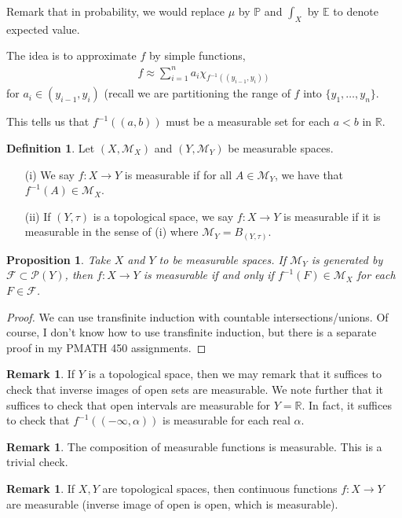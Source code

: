 \documentclass[11pt]{amsart}
\newtheorem{proposition}[theorem]{Proposition}
\theoremstyle{definition}
\newtheorem{definition}[theorem]{Definition}
\newtheorem{remark}[theorem]{Remark}
\numberwithin{equation}{section}
\begin{document}
Remark that in probability, we would replace $\mu$ by $\mathbb P$ and $\int_X$ by $\mathbb E$ to denote expected value.

The idea is to approximate $f$ by simple functions,
\begin{align*}
    f\approx\sum_{i=1}^na_i\chi_{f^{-1}((y_{i-1},y_i))}
\end{align*}
for $a_i\in(y_{i-1},y_i)$ (recall we are partitioning the range of $f$ into $\{y_1,\ldots,y_n\}$.

This tells us that $f^{-1}((a,b))$ must be a measurable set for each $a<b$ in $\mathbb R$.
\begin{definition}
    Let $(X,\mathcal M_X)$ and $(Y,\mathcal M_Y)$ be measurable spaces. 
    \begin{enumerate}
        \item [(i)] We say $f:X\to Y$ is measurable if for all $A\in\mathcal M_Y$, we have that $f^{-1}(A)\in\mathcal M_X$.
        \item [(ii)] If $(Y,\tau)$ is a topological space, we say $f:X\to Y$ is measurable if it is measurable in the sense of (i) where $\mathcal M_Y=B_{(Y,\tau)}$.
    \end{enumerate}
\end{definition}
\begin{proposition}
    Take $X$ and $Y$ to be measurable spaces. If $\mathcal M_Y$ is generated by $\mathcal F\subset \mathcal P(Y)$, then $f:X\to Y$ is measurable if and only if $f^{-1}(F)\in\mathcal M_X$ for each $F\in\mathcal F$.
\end{proposition}
\begin{proof}
    We can use transfinite induction with countable intersections/unions. Of course, I don't know how to use transfinite induction, but there is a separate proof in my PMATH 450 assignments.
\end{proof}
\begin{remark}
    If $Y$ is a topological space, then we may remark that it suffices to check that inverse images of open sets are measurable. We note further that it suffices to check that open intervals are measurable for $Y=\mathbb R$. In fact, it suffices to check that $f^{-1}((-\infty,\alpha))$ is measurable for each real $\alpha$.
\end{remark}
\begin{remark}
    The composition of measurable functions is measurable. This is a trivial check.
\end{remark}
\begin{remark}
    If $X,Y$ are topological spaces, then continuous functions $f:X\to Y$ are measurable (inverse image of open is open, which is measurable).
\end{remark}
\end{document}
